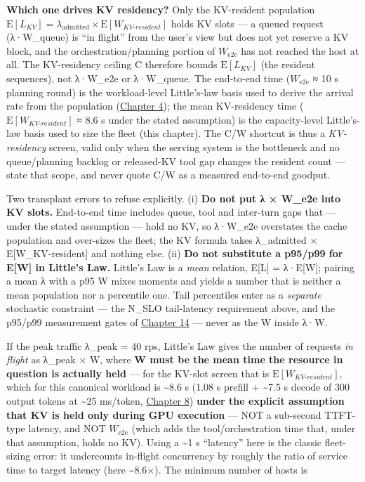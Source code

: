\textbf{Which one drives KV residency?} Only the KV-resident population
\(\mathrm{E}[L_{KV}] = \lambda_\mathrm{admitted} \times \mathrm{E}[W_{KV\text{-}resident}]\)
holds KV slots --- a queued request (λ·W\_queue) is ``in flight'' from
the user's view but does not yet reserve a KV block, and the
orchestration/planning portion of \(W_{\mathrm{e2e}}\) has not reached
the host at all. The KV-residency ceiling C therefore bounds
\(\mathrm{E}[L_{KV}]\) (the resident sequences), not λ·W\_e2e or
λ·W\_queue. The end-to-end time (\(W_{\mathrm{e2e}}\) ≈ 10 s planning
round) is the workload-level Little's-law basis used to derive the
arrival rate from the population (\hyperref[chap:4]{Chapter 4}); the mean KV-residency time
(\(\mathrm{E}[W_{KV\text{-}resident}]\) ≈ 8.6 s under the stated
assumption) is the capacity-level Little's-law basis used to size the
fleet (this chapter). The C/W shortcut is thus a \emph{KV-residency}
screen, valid only when the serving system is the bottleneck and no
queue/planning backlog or released-KV tool gap changes the resident
count --- state that scope, and never quote C/W as a measured end-to-end
goodput.

Two transplant errors to refuse explicitly. (i) \textbf{Do not put λ ×
W\_e2e into KV slots.} End-to-end time includes queue, tool and
inter-turn gaps that --- under the stated assumption --- hold no KV, so
λ·W\_e2e overstates the cache population and over-sizes the fleet; the
KV formula takes λ\_admitted × E{[}W\_KV-resident{]} and nothing else.
(ii) \textbf{Do not substitute a p95/p99 for E\mbox{{[}W{]}} in Little's Law.}
Little's Law is a \emph{mean} relation, E\mbox{{[}L{]}} = λ·E\mbox{{[}W{]}}; pairing a
mean λ with a p95 W mixes moments and yields a number that is neither a
mean population nor a percentile one. Tail percentiles enter as a
\emph{separate} stochastic constraint --- the N\_SLO tail-latency
requirement above, and the p95/p99 measurement gates of \hyperref[chap:14]{Chapter 14} ---
never as the W inside λ·W.

If the peak traffic λ\_peak = 40 rps, Little's Law gives the number of
requests \emph{in flight} as λ\_peak × W, where \textbf{W must be the
mean time the resource in question is actually held} --- for the KV-slot
screen that is \(\mathrm{E}[W_{KV\text{-}resident}]\), which for this
canonical workload is \textasciitilde8.6 s (1.08 s prefill +
\textasciitilde7.5 s decode of 300 output tokens at \textasciitilde25
ms/token, \hyperref[chap:8]{Chapter 8}) \textbf{under the explicit assumption that KV is
held only during GPU execution} --- NOT a sub-second TTFT-type latency,
and NOT \(W_{\mathrm{e2e}}\) (which adds the tool/orchestration time
that, under that assumption, holds no KV). Using a \textasciitilde1 s
``latency'' here is the classic fleet-sizing error: it undercounts
in-flight concurrency by roughly the ratio of service time to target
latency (here \textasciitilde8.6×). The minimum number of hosts is

